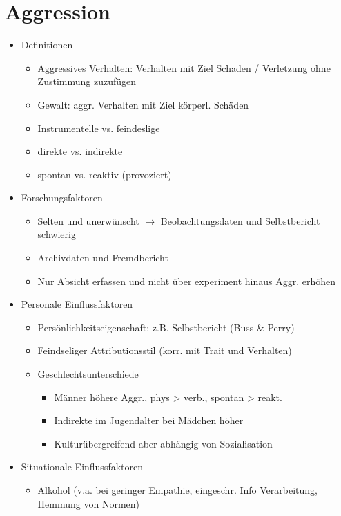 \documentclass[11pt, paper=a4, twocolumn]{scrartcl}
\begin{document}
	\section{Aggression}
		\begin{itemize}
			\item Definitionen
				\begin{itemize}
					\item Aggressives Verhalten: Verhalten mit Ziel Schaden / Verletzung ohne Zustimmung zuzufügen
					\item Gewalt: aggr. Verhalten mit Ziel körperl. Schäden
					\item Instrumentelle vs. feindeslige
					\item direkte vs. indirekte
					\item spontan vs. reaktiv (provoziert)
				\end{itemize}
			\item Forschungsfaktoren
				\begin{itemize}
					\item Selten und unerwünscht $\rightarrow$ Beobachtungsdaten und Selbstbericht schwierig
					\item Archivdaten und Fremdbericht
					\item Nur Absicht erfassen und nicht über experiment hinaus Aggr. erhöhen
				\end{itemize}
			\item Personale Einflussfaktoren
				\begin{itemize}
					\item Persönlichkeitseigenschaft: z.B. Selbstbericht (Buss \& Perry)
					\item Feindseliger Attributionsstil (korr. mit Trait und Verhalten)
					\item Geschlechtsunterschiede
						\begin{itemize}
							\item Männer höhere Aggr., phys > verb., spontan > reakt.
							\item Indirekte im Jugendalter bei Mädchen höher
							\item Kulturübergreifend aber abhängig von Sozialisation
						\end{itemize}
				\end{itemize}
			\item Situationale Einflussfaktoren
				\begin{itemize}
					\item Alkohol (v.a. bei geringer Empathie, eingeschr. Info Verarbeitung, Hemmung von Normen)

\end{itemize}
\end{itemize}
\end{document}
